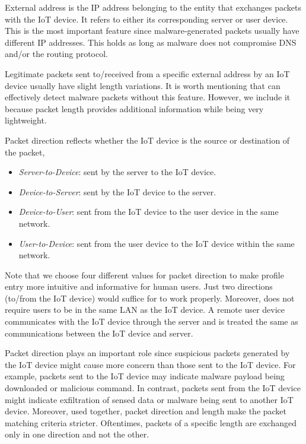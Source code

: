 External address is the IP address belonging to the entity that exchanges packets with the IoT device. It refers to either its corresponding server or user device. This is the most important feature since malware-generated packets usually have different IP addresses. This holds as long as malware does not compromise DNS and/or the routing protocol. 

Legitimate packets sent to/received from a specific external address by an IoT device usually have slight length variations.  
It is worth mentioning that \system{} can effectively detect malware packets without this feature. However, we include it because packet length provides additional information while being very lightweight.  

Packet direction reflects whether the IoT device is the source or destination of the packet, \ie{}
\begin{itemize}
    \item \textit{Server-to-Device}: sent by the server to the IoT device.
    \item \textit{Device-to-Server}: sent by the IoT device to the server.
    \item \textit{Device-to-User}: sent from the IoT device to the user device in the same network.
    \item \textit{User-to-Device}: sent from the user device to the IoT device within the same network.
\end{itemize}
Note that we choose four different values for packet direction to make profile entry more intuitive and informative for human users. Just two directions (to/from the IoT device) would suffice for \system{} to work properly. Moreover, \system{} does not require users to be in the same LAN as the IoT device. A remote user device communicates with the IoT device through the server and is treated the same as communications between the IoT device and server.

Packet direction plays an important role since suspicious packets generated by the IoT device might cause more concern than those sent to the IoT device. For example, packets sent to the IoT device may indicate malware payload being downloaded or malicious command. In contrast, packets sent from the IoT device might indicate exfiltration of sensed data or malware being sent to another IoT device. Moreover, used together, packet direction and length make the packet matching criteria stricter. Oftentimes, packets of a specific length are exchanged only in one direction and not the other.  

